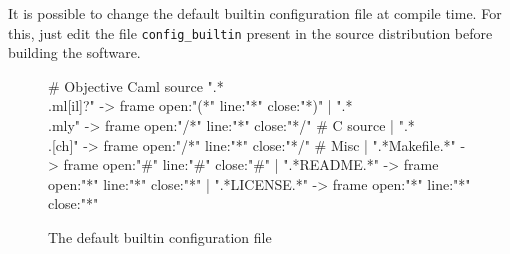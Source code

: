 \documentclass{article}
\begin{document}
It is possible to change the default builtin configuration file at
compile time.  For this, just edit the file \verb+config_builtin+
present in the source distribution before building the software.


\begin{figure}
\begin{center}
\begin{boxedverbatim}
# Objective Caml source 
  ".*\\.ml[il]?" -> frame open:"(*" line:"*" close:"*)"
| ".*\\.mly"     -> frame open:"/*" line:"*" close:"*/"
# C source
| ".*\\.[ch]"    -> frame open:"/*" line:"*" close:"*/"
# Misc
| ".*Makefile.*" -> frame open:"#"  line:"#" close:"#"
| ".*README.*"   -> frame open:"*"  line:"*" close:"*"
| ".*LICENSE.*"  -> frame open:"*"  line:"*" close:"*"
\end{boxedverbatim}
\end{center}
  \caption{The default builtin configuration file}
  \label{figure:config}
\end{figure}
\end{document}
